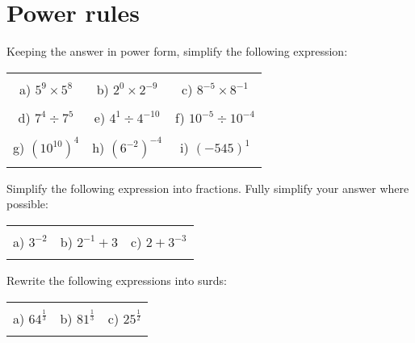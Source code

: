 \documentclass[12pt]{article}
\begin{document}
\section{Power rules}
Keeping the answer in power form, simplify the following expression:
\begin{table}[h!]
\centering
\begin{tabular}{c c c}
\hspace{5cm} & \hspace{5cm} & \hspace{5cm} \\
a) ${5}^{9}\times{5}^{8}$ & b) ${2}^{0}\times{2}^{-9}$ & c) ${8}^{-5}\times{8}^{-1}$ \\ \\
d) ${7}^{4}\div{7}^{5}$ & e) ${4}^{1}\div{4}^{-10}$ & f) ${10}^{-5}\div{10}^{-4}$ \\ \\
g) $({10}^{10})^{4}$ & h) $({6}^{-2})^{-4}$ & i) $({-545})^1$ \\ \\
\end{tabular}
\end{table}
\newline
Simplify the following expression into fractions. Fully simplify your answer where possible:
\begin{table}[h!]
\centering
\begin{tabular}{c c c}
\hspace{5cm} & \hspace{5cm} & \hspace{5cm} \\
a) ${3}^{-2}$ & b) ${2}^{-1} + {3}$ & c) ${2} + {3}^{-3}$ \\ \\
\end{tabular}
\end{table}
\newline
Rewrite the following expressions into surds:
\begin{table}[h!]
\centering
\begin{tabular}{c c c}
\hspace{5cm} & \hspace{5cm} & \hspace{5cm} \\
a) ${64}^\frac{1}{{3}}$ & b) ${81}^\frac{1}{{3}}$ & c) ${25}^\frac{1}{{2}}$ \\ \\
\end{tabular}
\end{table}
\newline
\newpage
\end{document}
